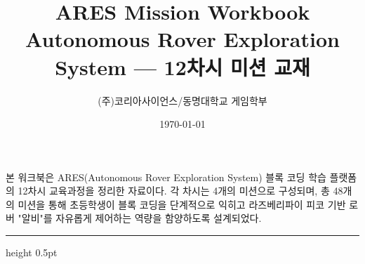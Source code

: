 \documentclass[11pt, oneside]{article}
\title{%
  {\sffamily\bfseries\fontsize{24}{28}\selectfont\color{deepblue}ARES Mission Workbook}\\[6pt]
  {\rmfamily\normalsize\color{accentcopper}Autonomous Rover Exploration System --- 12차시 미션 교재}%
}
\author{\sffamily (주)코리아사이언스\quad/\quad 동명대학교 게임학부}
\date{\today}
\begin{document}
\maketitle
\thispagestyle{plain}

\begin{bodyquote}
본 워크북은 ARES(Autonomous Rover Exploration System) 블록 코딩 학습
플랫폼의 12차시 교육과정을 정리한 자료이다. 각 차시는 4개의 미션으로
구성되며, 총 48개의 미션을 통해 초등학생이 블록 코딩을 단계적으로
익히고 라즈베리파이 피코 기반 로버 "알비"를 자유롭게 제어하는 역량을
함양하도록 설계되었다.
\end{bodyquote}

\vspace{1em}
{\color{rulegray}\hrule height 0.5pt}
\vspace{0.8em}

\tableofcontents
\newpage













\end{document}
